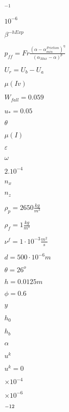 \documentclass{article}
\begin{document}
$^{-1}$
\pagebreak

$ 10^{-6} $
\pagebreak

$ \beta^{-hExp}$
\pagebreak

$ p_{ff} = Fr \frac{\left( \alpha - \alpha_{min}^{Friction} \right)^{\eta}}{\left(\alpha_{Max} - \alpha \right)^p} $
\pagebreak

$ U_r=U_b-U_a $
\pagebreak

$\mu(Iv)$
\pagebreak

$W_{fall}=0.059$
\pagebreak

$u_*=0.05$
\pagebreak

$\theta$
\pagebreak

$\mu(I)$
\pagebreak

$\varepsilon$
\pagebreak

$\omega$
\pagebreak

$ 2.10^{-4}$
\pagebreak

$ n_{x}$
\pagebreak

$ n_{z}$
\pagebreak

$\rho_p=2650 \frac{kg}{m^3}$
\pagebreak

$\rho_f=1 \frac{kg}{m^3}$
\pagebreak

$\nu^f=1 \cdot 10^{-3} \frac{m^2}{s}$
\pagebreak

$d=500 \cdot 10^{-6} m$
\pagebreak

$\theta=26^o $
\pagebreak

$h=0.0125 m$
\pagebreak

$\phi=0.6$
\pagebreak

$y$
\pagebreak

$h_0$
\pagebreak

$h_b$
\pagebreak

$\alpha$
\pagebreak

$u^k$
\pagebreak

$u^k=0$
\pagebreak

$\times 10^{-4}$
\pagebreak

$\times 10^{-6}$
\pagebreak

$\time 10^{-12}$
\pagebreak
\end{document}
